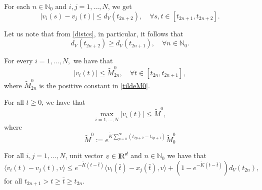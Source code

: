 \documentclass[a4paper,11pt,oneside]{article}
\newcommand{\RR}{{{\rm I} \kern -.15em {\rm R} }}
\begin{document}
\begin{lem}\label{L2-1cs}
	For each $n\in \mathbb{N}_{0}$ and $i,j=1,\dots,N$, we get \begin{equation}
		\label{dist-1cs}
		\lvert v_{i}(s)-v_{j}(t)\rvert\leq d_{V}(t_{2n+2}), \quad\forall s,t\in [t_{2n+1},t_{2n+2}].
	\end{equation} 
\end{lem}

\begin{oss}
	Let us note that from \eqref{distcs}, in particular, it follows that
	\begin{equation}\label{crecs}
		d_{V}(t_{2n+2})\geq d_{V}(t_{2n+1}),\quad \forall n\in \mathbb{N}_{0}.
	\end{equation}
	
\end{oss}
\begin{lem}\label{L3cs}
	For every $i=1,\dots,N,$ we have that \begin{equation}\label{boundsolcs}
		\lvert v_{i}(t)\rvert\leq \tilde M_{2n}^{0},\quad \forall t\in [t_{2n},t_{2n+1}],
	\end{equation}
	where $\tilde {M}_{2n}^{0}$	is the positive constant in \eqref{tildeM0}.
\end{lem}
\begin{lem}
	For all $t\geq 0$, we have that
	\begin{equation}\label{unifboundsolcs}
		\max_{i=1,\dots,N}\lvert v_{i}(t)\rvert\leq \tilde M^{0},
	\end{equation}
	where 
	\begin{equation}\label{mocs}
		\tilde M^0:=e^{\tilde K\sum_{p=0}^{\infty}(t_{2p+2}-t_{2p+1})}\tilde{M}^{0}_{0}
	\end{equation}
\end{lem}

\begin{prop}\label{L4cs}
	For all $i,j=1,\dots,N$,  unit vector $v\in \RR^{d}$ and $n\in\mathbb{N}_{0}$ we have that 
	\begin{equation}\label{4cs}
		\langle v_{i}(t)-v_{j}(t),v\rangle\leq e^{-\tilde K(t-\bar{t})}\langle v_{i}(\bar{t})-x_{j}(\bar{t}),v\rangle+(1-e^{-\tilde K(t-\bar{t})})d_{V}(t_{2n}),
	\end{equation}
	for all $t_{2n+1}>t\geq \bar{t}\geq t_{2n}$. 
\end{prop}
\end{document}
